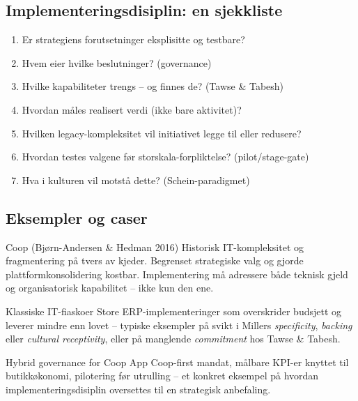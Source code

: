 \subsection{Implementeringsdisiplin: en sjekkliste}
\begin{enumerate}
  \item Er strategiens forutsetninger eksplisitte og testbare?
  \item Hvem eier hvilke beslutninger? (governance)
  \item Hvilke kapabiliteter trengs -- og finnes de? (Tawse \& Tabesh)
  \item Hvordan måles realisert verdi (ikke bare aktivitet)?
  \item Hvilken legacy-kompleksitet vil initiativet legge til eller redusere?
  \item Hvordan testes valgene før storskala-forpliktelse? (pilot/stage-gate)
  \item Hva i kulturen vil motstå dette? (Schein-paradigmet)
\end{enumerate}

\subsection{Eksempler og caser}
\begin{eksempelboks}{Coop (Bjørn-Andersen \& Hedman 2016)}
Historisk IT-kompleksitet og fragmentering på tvers av kjeder. Begrenset
strategiske valg og gjorde plattformkonsolidering kostbar. Implementering må
adressere både teknisk gjeld og organisatorisk kapabilitet -- ikke kun den
ene.
\end{eksempelboks}

\begin{eksempelboks}{Klassiske IT-fiaskoer}
Store ERP-implementeringer som overskrider budsjett og leverer mindre enn
lovet -- typiske eksempler på svikt i Millers \emph{specificity},
\emph{backing} eller \emph{cultural receptivity}, eller på manglende
\emph{commitment} hos Tawse \& Tabesh.
\end{eksempelboks}

\begin{eksempelboks}{Hybrid governance for Coop App}
Coop-first mandat, målbare KPI-er knyttet til butikkøkonomi, pilotering før
utrulling -- et konkret eksempel på hvordan implementeringsdisiplin
oversettes til en strategisk anbefaling.
\end{eksempelboks}

